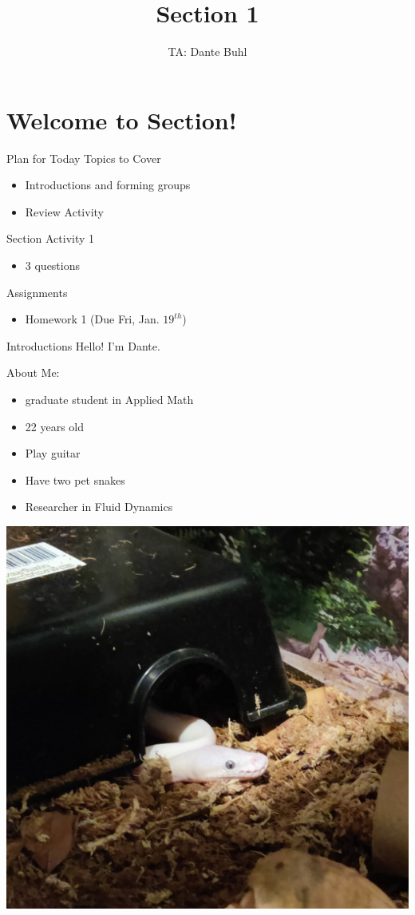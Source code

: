 \documentclass{beamer}
\title{Section 1}
\author{TA: Dante Buhl}
\institute{UCSC Math-19A}
\begin{document}
\newcommand{\bmp}[1]{\begin{minipage}{#1\textwidth}}
\newcommand{\emp}{\end{minipage}}


\frame{\titlepage}

\section{Welcome to Section!}
\begin{frame}{Plan for Today}
    Topics to Cover
    \begin{itemize}
        \item Introductions and forming groups
        \item Review Activity
    \end{itemize}
    Section Activity 1
    \begin{itemize}
        \item 3 questions
    \end{itemize}
    Assignments
    \begin{itemize}
        \item Homework 1 (Due Fri, Jan. $19^{th}$)
    \end{itemize}
\end{frame}

\begin{frame}{Introductions}
    Hello! I'm Dante. 
    \vspace{10pt}

    \bmp{.4}
        About Me:
        \begin{itemize}
            \item graduate student in Applied Math
            \item 22 years old
            \item Play guitar
            \item Have two pet snakes
            \item Researcher in Fluid Dynamics
        \end{itemize}
    \emp
    \hspace{5pt}
    \bmp{.55}
        \centering
        \includegraphics[width=.75\textwidth]{duncan.jpg}
    \emp
\end{frame}
\end{document}
